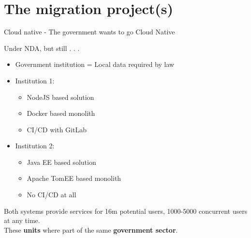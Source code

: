 \documentclass[aspectratio=169]{beamer}
\begin{document}
{
	\section{The migration project(s)}
}
\begin{frame}{Cloud native - The government wants to go Cloud Native}

Under NDA, but still . . .\

\begin{itemize}
 \item Government institution = Local data required by law
 \item Institution 1:
\begin{itemize}
 \item NodeJS based solution
 \item Docker based monolith
 \item CI/CD with GitLab
 \end{itemize}
  \item Institution 2:
  \begin{itemize}
   \item Java EE based solution
   \item Apache TomEE based monolith
   \item No CI/CD at all
   \end{itemize}
\end{itemize}

Both systems provide services for 16m potential users, 1000-5000 concurrent users at any time.\\


These \textbf{units} where part of the same \textbf{government sector}. 

\end{frame}
\end{document}
